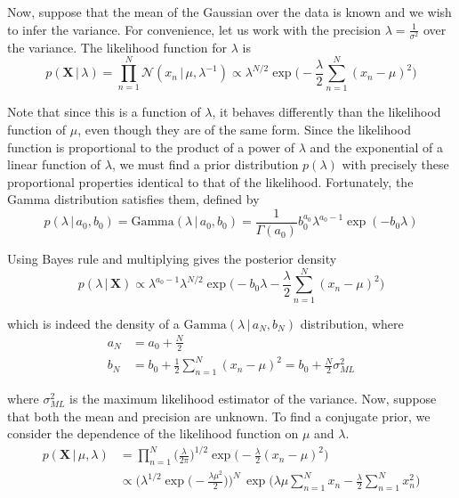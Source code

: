 \documentclass{article}
\begin{document}
    Now, suppose that the mean of the Gaussian over the data is known and we wish to infer the variance. For convenience, let us work with the precision $\lambda = \frac{1}{\sigma^2}$ over the variance. The likelihood function for $\lambda$ is
    \begin{equation}
      p(\mathbf{X}\,|\,\lambda) = \prod_{n=1}^N \mathcal{N} (x_n\,|\, \mu, \lambda^{-1}) \propto \lambda^{N/2} \exp \bigg(-\frac{\lambda}{2} \sum_{n=1}^N (x_n - \mu)^2 \bigg)
    \end{equation}

    Note that since this is a function of $\lambda$, it behaves differently than the likelihood function of $\mu$, even though they are of the same form. Since the likelihood function is proportional to the product of a power of $\lambda$ and the exponential of a linear function of $\lambda$, we must find a prior distribution $p(\lambda)$ with precisely these proportional properties identical to that of the likelihood. Fortunately, the Gamma distribution satisfies them, defined by
    \begin{equation}
      p(\lambda\,|\,a_0, b_0) = \text{Gamma}(\lambda\,|\, a_0, b_0) = \frac{1}{\Gamma(a_0)} b_0^{a_0} \lambda^{a_0-1} \exp(-b_0 \lambda)
    \end{equation}

    Using Bayes rule and multiplying gives the posterior density
    \begin{equation}
      p(\lambda\,|\,\mathbf{X}) \propto \lambda^{a_0 - 1} \lambda^{N/2} \exp\bigg( -b_0 \lambda - \frac{\lambda}{2} \sum_{n=1}^N (x_n - \mu)^2 \bigg)
    \end{equation}

    which is indeed the density of a $\text{Gamma}(\lambda\,|\,a_N, b_N)$ distribution, where
    \begin{align*}
      a_N & = a_0 + \frac{N}{2} \\
      b_N & = b_0 + \frac{1}{2} \sum_{n=1}^N (x_n - \mu)^2 = b_0 + \frac{N}{2} \sigma_{ML}^2
    \end{align*}

    where $\sigma_{ML}^2$ is the maximum likelihood estimator of the variance. Now, suppose that both the mean and precision are unknown. To find a conjugate prior, we consider the dependence of the likelihood function on $\mu$ and $\lambda$.
    \begin{align*}
      p(\mathbf{X}\,|\,\mu, \lambda) & = \prod_{n=1}^N \bigg(\frac{\lambda}{2\pi}\bigg)^{1/2} \exp \bigg( -\frac{\lambda}{2} (x_n - \mu)^2 \bigg) \\
      & \propto \bigg(\lambda^{1/2} \exp \Big(-\frac{\lambda \mu^2}{2} \Big) \bigg)^N \, \exp \bigg( \lambda \mu \sum_{n=1}^N x_n - \frac{\lambda}{2} \sum_{n=1}^N x_n^2 \bigg)
    \end{align*}
\end{document}
